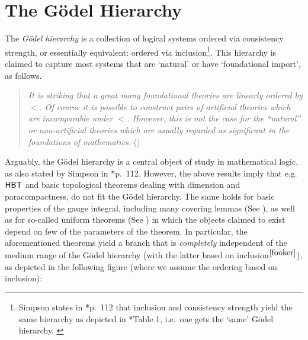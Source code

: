 \documentclass[reqno]{amsart}
\def\HBT{\textup{\textsf{HBT}}}
\numberwithin{equation}{section}
\numberwithin{thm}{section}
\begin{document}
\section{The G\"odel Hierarchy}\label{kurtzenhier}
The \emph{G\"odel hierarchy} is a collection of logical systems ordered via consistency strength, or essentially equivalent: ordered via inclusion\footnote{Simpson states in \cite{sigohi}*{p.\ 112} that inclusion and consistency strength yield the same hierarchy as depicted in \cite{sigohi}*{Table 1}, i.e.\ one gets the `same' G\"odel hierarchy. \label{fooker}}.  This hierarchy is claimed to capture most systems that are `natural' or have `foundational import', as follows. 
\begin{quote}
\emph{It is striking that a great many foundational theories are linearly ordered by $<$. Of course it is possible to construct pairs of artificial theories which are incomparable under $<$. However, this is not the case for the ``natural'' or non-artificial theories which are usually regarded as significant in the foundations of mathematics.} (\cite{sigohi})
\end{quote}
Arguably, the G\"odel hierarchy is a central object of study in mathematical logic, as also stated by Simpson in \cite{sigohi}*{p.\ 112}.  
However, the above results imply that e.g.\ $\HBT$ and basic topological theorems dealing with dimension and paracompactness, do not fit the G\"odel hierarchy.  
The same holds for basic properties of the gauge integral, including many covering lemmas (See \cite{dagsamIII}), as well as for so-called uniform theorems (See \cite{dagsamV}) in which the objects claimed to exist depend on few of the parameters of the theorem.
In particular, the aforementioned theorems yield a branch that is \emph{completely} independent of the medium range of the G\"odel hierarchy (with the latter based on inclusion$^{\ref{fooker}}$), as depicted in the following figure (where we assume the ordering based on inclusion): 
\end{document}
